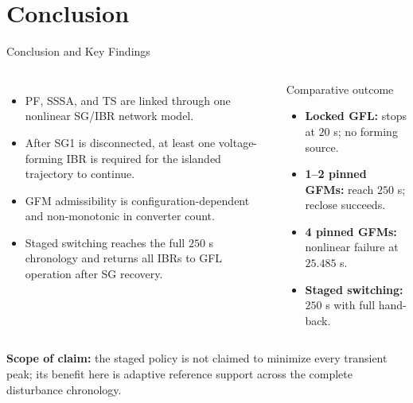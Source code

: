 \documentclass{beamer}
\begin{document}
\section{Conclusion}
\begin{frame}{Conclusion and Key Findings}
\begin{columns}[c,onlytextwidth]
\footnotesize
\begin{itemize}
  \item PF, SSSA, and TS are linked through one nonlinear SG/IBR network model.
  \item After SG1 is disconnected, at least one voltage-forming IBR is required for the islanded trajectory to continue.
  \item GFM admissibility is configuration-dependent and non-monotonic in converter count.
  \item Staged switching reaches the full $250$ s chronology and returns all IBRs to GFL operation after SG recovery.
\end{itemize}
\footnotesize
\begin{block}{Comparative outcome}
\begin{itemize}
  \item \textbf{Locked GFL:} stops at $20$ s; no forming source.
  \item \textbf{1--2 pinned GFMs:} reach $250$ s; reclose succeeds.
  \item \textbf{4 pinned GFMs:} nonlinear failure at $25.485$ s.
  \item \textbf{Staged switching:} $250$ s with full hand-back.
\end{itemize}
\end{block}
\end{columns}
\vspace{0.12cm}
\footnotesize
\textbf{Scope of claim:} the staged policy is not claimed to minimize every transient peak; its benefit here is adaptive reference support across the complete disturbance chronology.
\end{frame}
\end{document}
